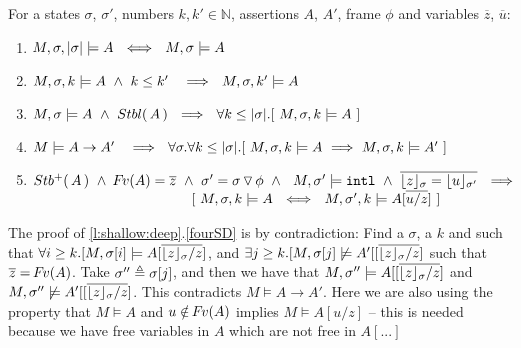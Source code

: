 {\begin{lemma}
\label{l:shallow:deep}
For a states $\sigma$, $\sigma'$, numbers $k,k'\in \mathbb{N}$, assertions  $A$, $A'$, frame $\phi$ and variables $\overline z$, $\overline u$:
\begin{enumerate}
\item
$ \satDAssertFrom M  \sigma { \DepthSt \sigma}   A \ \ \Longleftrightarrow\ \ M,\sigma \models A\ $
\item
$ \satDAssertFrom M  \sigma {k} A \ \wedge\  k\leq k'\  \  \   \Longrightarrow \ \ \satDAssertFrom M  \sigma {k'} A$ 
\item 
\label{shallow:to:deep}
$ M,\sigma \models A \ \wedge\ \Stable A \  \ \Longrightarrow \  \  \forall k  \leq  \DepthSt \sigma.[ \ \satDAssertFrom M  \sigma k   A \ ]$
\item
\label{fourSD}
$ M  \models A \rightarrow A'\  \  \   \Longrightarrow \ \ \forall \sigma. \forall k\leq  { \DepthSt \sigma}.[ \ \satDAssertFrom M  \sigma {k} A
\ \Longrightarrow \  \satDAssertFrom M  \sigma {k} A'\ ]$
\item
\label{fiveSD}
$\Pos A \ \wedge\ \fv(A)=\overline z\ \wedge\ \sigma'=\sigma  \pushSymbol \phi\ \wedge\ \ M, \sigma' \models \intThis \ \wedge\   \overline {\interpret \sigma z= {\interpret {\sigma'} u}}\ \ \Longrightarrow$ \\
$\strut \hspace{4cm} [\ \satDAssertFrom M  \sigma {k} A  
\ \ \Longleftrightarrow \ \ \satDAssertFrom M  {\sigma'} {k} {A[{\overline{u/z}}]}\ ]$
\end{enumerate}
\end{lemma}
 

\noindent
{The proof of \ref{l:shallow:deep}.\ref{fourSD} is by contradiction: Find a $\sigma$, a $k$ and   such that  
$\forall i\geq k.[M,{\sigma[i]} \models A[\overline{ {{\lfloor z \rfloor_{\sigma}}/ z}}]$, and
$\exists j\geq k.[M,{\sigma[j]} \not\models A'[[\overline{ {{\lfloor z \rfloor_{\sigma}}/ z}}]$
 such that $\overline z = {\hspace{-1pt}F\hspace{-1pt}}v(A)$.
 Take $\sigma''\triangleq  \sigma[j]$, and then we have that
 $M, \sigma'' \models A[[\overline{ {{\lfloor z \rfloor_{\sigma}}/ z}}]$ and  $M,  \sigma'' \not\models A'[[\overline{ {{\lfloor z \rfloor_{\sigma}}/ z}}]$.
 This contradicts $ M  \models A \rightarrow A'$.
 Here we are also using the property that $M \models A$  and $u\notin {\hspace{-1pt}F\hspace{-1pt}}v(A)$ implies $M \models A[u/z]$ -- this is needed because we have free variables in $A$ which are not free in $A[...]$}
 {}
 {}

}
